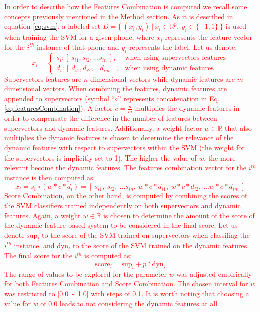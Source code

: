 \textcolor{red}{
	In order to describe how the Features Combination is computed we recall some
	concepts previously mentioned in the Method section.
	As it is described in equation \ref{eq:svm}, a labeled set
	\mbox{$D=\{ \ (x_{i}, y_{i}) \ | \ x_{i} \in \mathbb{R}^{p}, \ y_{i} \in \{-1, 1\} \ \}$}
	is used
	when training the SVM for a given phone, where $x_{i}$ represents the feature vector for the
	$i^{th}$ instance of that phone and $y_{i}$ represents the label.
	Let us denote:
	\begin{equation}
		x_{i} =
		\begin{cases}
			s_{i} : [ \ s_{i1}, s_{i2}, \dotsc s_{in} \ ], & \text{when using supervectors features} \\
			d_{i} : [ \ d_{i1}, d_{i2}, \dotsc d_{im} \ ], & \text{when using dynamic features}
		\end{cases}
	\end{equation}
	Supervectors features are $n$-dimensional vectors while dynamic features are $m$-dimensional
	vectors. When combining the features, dynamic features are appended to supervectors
	(symbol ``$\circ$'' represents concatenation in Eq. \ref{eq:featuresCombination}).
	A factor $c = \frac{n}{m}$ multiplies the dynamic features
	in order to compensate the difference in
	the number of features between supervectors and dynamic features.
	Additionally, a weight factor $w \in \mathbb{R}$ that also multiplies the dynamic features
	is chosen to determine the relevance of the dynamic features with respect to supervectors
	within the SVM (the weight for the supervectors is implicitly set to 1).
	The higher the value of $w$, the more relevant become the dynamic features.
	The features combination vector for the $i^{th}$ instance is then computed as:
	\begin{equation}
		x_{i}^{\prime} = s_{i} \circ (w * c * d_{i}) = [ \ s_{i1}, \ s_{i2}, \ \dotsc s_{in}, \ w * c * d_{i1}, \ w * c * d_{i2}, \ \dotsc w * c * d_{im} \ ]
		\label{eq:featuresCombination}
	\end{equation}
	Score Combination, on the other hand, is computed by combining the scores
	of the SVM classifiers trained independently on both supervectors and dynamic features.
	Again, a weight $w \in \mathbb{R}$
	is chosen to determine the amount of the score of the dynamic-feature-based system to be considered
	in the final score. Let us denote $\text{sup}_{i}$ to the score of the
	SVM trained on supervectors when classifing the $i^{th}$ instance,
	and $\text{dyn}_{i}$ to the score of the SVM trained on the dynamic features. The final score for the
	$i^{th}$ is computed as:
	\begin{equation}
		\text{score}_{i} = \text{sup}_{i} + p * \text{dyn}_{i}
	\end{equation}
	The range of values to be explored for the parameter $w$ was adjusted empirically for both
	Features Combination and Score Combination. The chosen interval for $w$ was restricted
	to \mbox{[0.0 - 1.0]} with steps of 0.1. It is worth noting that choosing
	a value for $w$ of 0.0 leads to not considering the dynamic features at all.
}

